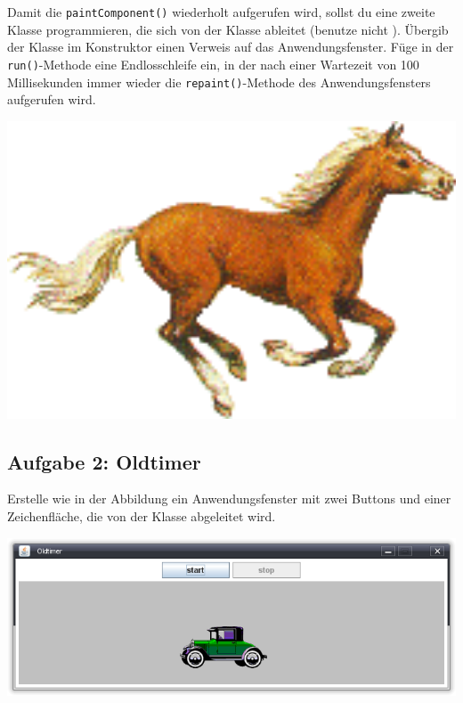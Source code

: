 \begin{minipage}{0.6\textwidth}
Damit die \lstinline|paintComponent()| wiederholt aufgerufen wird, sollst du
eine zweite Klasse programmieren, die sich von der Klasse 
ableitet (benutze nicht ). Übergib der Klasse im
Konstruktor einen Verweis auf das Anwendungsfenster. Füge in der
\lstinline|run()|-Methode eine Endlosschleife ein, in der nach einer Wartezeit
von 100 Millisekunden immer wieder die \lstinline|repaint()|-Methode des
Anwendungsfensters aufgerufen wird.
\end{minipage}
\hfill
\begin{minipage}{0.25\textwidth}
\includegraphics[width=1.0\textwidth]{./inf/SEKII/26_Java_Threads/Pferd.png}
\end{minipage}


\subsection{Aufgabe 2: Oldtimer}

Erstelle wie in der Abbildung ein Anwendungsfenster mit zwei Buttons und einer
Zeichenfläche, die von der Klasse  abgeleitet wird.

\includegraphics[width=1.0\textwidth]{./inf/SEKII/26_Java_Threads/Oldtimer.png}


